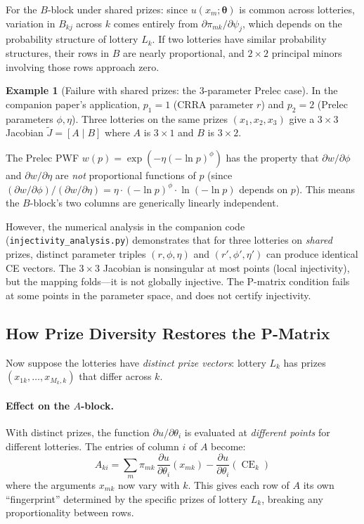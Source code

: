 \documentclass[11pt,a4paper]{article}
\theoremstyle{definition}
\newtheorem{example}[theorem]{Example}
\newcommand{\btheta}{\boldsymbol{\theta}}
\DeclareMathOperator{\CE}{CE}
\begin{document}
For the $B$-block under shared prizes: since $u(x_m; \btheta)$ is common
across lotteries, variation in $B_{kj}$ across $k$ comes entirely from
$\partial\pi_{mk}/\partial\psi_j$, which depends on the probability structure
of lottery $L_k$. If two lotteries have similar probability structures, their
rows in $B$ are nearly proportional, and $2 \times 2$ principal minors
involving those rows approach zero.

\begin{example}[Failure with shared prizes: the 3-parameter Prelec case]
\label{ex:shared_failure}
In the companion paper's application, $p_1 = 1$ (CRRA parameter $r$) and
$p_2 = 2$ (Prelec parameters $\phi, \eta$). Three lotteries on the same
prizes $(x_1, x_2, x_3)$ give a $3 \times 3$ Jacobian $\widetilde{J} =
[A \mid B]$ where $A$ is $3 \times 1$ and $B$ is $3 \times 2$.

The Prelec PWF $w(p) = \exp(-\eta(-\ln p)^\phi)$ has the property that
$\partial w / \partial \phi$ and $\partial w / \partial \eta$ are \emph{not}
proportional functions of $p$ (since
$(\partial w/\partial \phi) / (\partial w/\partial \eta) =
\eta \cdot (-\ln p)^\phi \cdot \ln(-\ln p)$ depends on $p$). This means the
$B$-block's two columns are generically linearly independent.

However, the numerical analysis in the companion code
(\texttt{injectivity\_analysis.py}) demonstrates that for three lotteries on
\emph{shared} prizes, distinct parameter triples $(r, \phi, \eta)$ and
$(r', \phi', \eta')$ can produce identical CE vectors. The $3 \times 3$
Jacobian is nonsingular at most points (local injectivity), but the mapping
folds---it is not globally injective. The P-matrix condition fails at some
points in the parameter space, and  does not
certify injectivity.
\end{example}

\subsection{How Prize Diversity Restores the P-Matrix}

Now suppose the lotteries have \emph{distinct prize vectors}: lottery $L_k$
has prizes $(x_{1k}, \ldots, x_{M_k,k})$ that differ across $k$.

\paragraph{Effect on the $A$-block.}
With distinct prizes, the function $\partial u / \partial \theta_i$ is
evaluated at \emph{different points} for different lotteries. The entries of
column $i$ of $A$ become:
\begin{equation}
    A_{ki} = \sum_{m} \pi_{mk} \,
    \frac{\partial u}{\partial \theta_i}(x_{mk})
    - \frac{\partial u}{\partial \theta_i}(\CE_k)
\end{equation}
where the arguments $x_{mk}$ now vary with $k$. This gives each row of $A$
its own ``fingerprint'' determined by the specific prizes of lottery $L_k$,
breaking any proportionality between rows.
\end{document}
